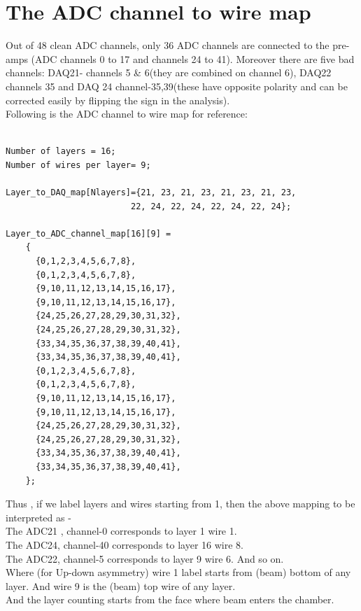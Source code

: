 \documentclass[12pt]{article}
\begin{document}
\section{The ADC channel to wire map}
Out of 48 clean ADC channels, only 36 ADC channels are connected to the pre-amps (ADC channels 0 to 17 and channels 24 to 41). Moreover there are five bad channels: DAQ21- channels 5 \& 6(they are combined on channel 6), DAQ22 channels 35 and DAQ 24 channel-35,39(these have opposite polarity and can be corrected easily by flipping the sign in the analysis). \\
Following is the ADC channel to wire map for reference:
\begin{lstlisting}

Number of layers = 16;
Number of wires per layer= 9;

Layer_to_DAQ_map[Nlayers]={21, 23, 21, 23, 21, 23, 21, 23,
                         22, 24, 22, 24, 22, 24, 22, 24};

Layer_to_ADC_channel_map[16][9] =
    {
      {0,1,2,3,4,5,6,7,8},
      {0,1,2,3,4,5,6,7,8},
      {9,10,11,12,13,14,15,16,17},
      {9,10,11,12,13,14,15,16,17},
      {24,25,26,27,28,29,30,31,32},
      {24,25,26,27,28,29,30,31,32},
      {33,34,35,36,37,38,39,40,41},
      {33,34,35,36,37,38,39,40,41},
      {0,1,2,3,4,5,6,7,8},
      {0,1,2,3,4,5,6,7,8},
      {9,10,11,12,13,14,15,16,17},
      {9,10,11,12,13,14,15,16,17},
      {24,25,26,27,28,29,30,31,32},
      {24,25,26,27,28,29,30,31,32},
      {33,34,35,36,37,38,39,40,41},
      {33,34,35,36,37,38,39,40,41},
    };
\end{lstlisting}
Thus , if we label layers and wires starting from 1, then the above mapping to be interpreted as - \\
The ADC21 , channel-0 corresponds to layer 1 wire 1. \\
The ADC24, channel-40 corresponds to layer 16 wire 8.\\
The ADC22, channel-5 corresponds to layer 9 wire 6. And so on.\\  
Where (for Up-down asymmetry) wire 1 label starts from (beam) bottom of any layer. And wire 9 is the (beam) top wire of any layer.\\
And the layer counting starts from the face where beam enters the chamber. \\
\end{document}
